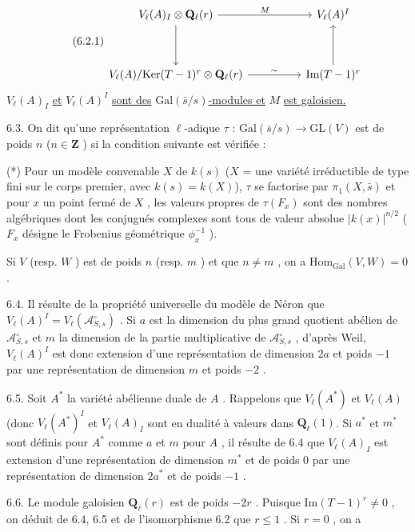 \begin{equation}\tag{6.2.1}
\begin{tikzcd}[column sep=huge, row sep=huge]
V_{\ell}(A)_{I} \otimes \mathbf{Q}_{\ell}(r) \arrow[r, "M"] \arrow[d] & V_{\ell}(A)^{I} \\
V_{\ell}(A)/\mathrm{Ker}(T-1)^{r} \otimes \mathbf{Q}_{\ell}(r) \arrow[r, "\sim"] & \mathrm{Im}(T-1)^{r} \arrow[u]
\end{tikzcd}
\end{equation}
$V_{\ell}(A)_{I}$ \underline{et} $V_{\ell}(A)^{I}$ \underline{sont des} $\mathrm{Gal}(\bar{s}/s)$\underline{-modules et} $M$ \underline{est galoisien.}

6.3. On dit qu'une représentation $\ell$-adique $\tau$ : $\mathrm{Gal}(\bar{s}/s) \longrightarrow \mathrm{GL}(V)$ est de poids $n$ ($n \in \mathbf{Z}$ ) si la condition suivante est vérifiée :

(*) Pour un modèle convenable $X$ de $k(s)$ ($X$ = une variété irréductible de type fini sur le corps premier, avec $k(s) = k(X)$), $\tau$ se factorise par $\pi_{1}(X,\bar{s})$ et pour $x$ un point fermé de $X$ , les valeurs propres de $\tau(F_{x})$ sont des nombres algébriques dont les conjugués complexes sont tous de valeur absolue $|k(x)|^{n/2}$ ($F_{x}$ désigne le Frobenius géométrique $\phi_{x}^{-1}$ ).



Si $V$ (resp. $W$ ) est de poids $n$ (resp. $m$ ) et que $n \neq m$ , on a $\mathrm{Hom}_{\mathrm{Gal}}(V,W) = 0$ .

6.4. Il résulte de la propriété universelle du modèle de Néron que $V_{\ell}(A)^{I} = V_{\ell}(\mathcal{A}^{\circ}_{S,s})$ . Si $a$ est la dimension du plus grand quotient abélien de $\mathcal{A}^{\circ}_{S,s}$ et $m$ la dimension de la partie multiplicative de $\mathcal{A}^{\circ}_{S,s}$ , d'après Weil, $V_{\ell}(A)^{I}$ est donc extension d'une représentation de dimension $2a$ et poids $-1$ par une représentation de dimension $m$ et poids $-2$ .

6.5. Soit $A^{*}$ la variété abélienne duale de $A$ . Rappelons que $V_{\ell}(A^{*})$ et $V_{\ell}(A)$ (donc $V_{\ell}(A^{*})^{I}$ et $V_{\ell}(A)_{I}$ sont en dualité à valeurs dans $\mathbf{Q}_{\ell}(1)$. Si $a^{*}$ et $m^{*}$ sont définis pour $A^{*}$ comme $a$ et $m$ pour $A$ , il résulte de 6.4 que $V_{\ell}(A)_{I}$ est extension d'une représentation de dimension $m^{*}$ et de poids 0 par une représentation de dimension $2a^{*}$ et de poids $-1$ .

6.6. Le module galoisien $\mathbf{Q}_{\ell}(r)$ est de poids $-2r$ . Puisque $\mathrm{Im}(T-1)^{r} \neq 0$ , on déduit de 6.4, 6.5 et de l'isomorphisme 6.2 que $r \leqslant 1$ . Si $r = 0$ , on a

